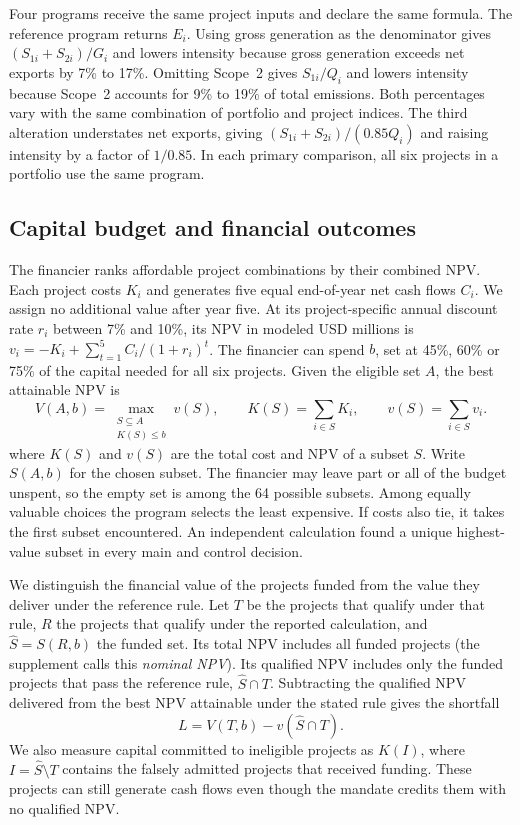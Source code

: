\documentclass[ijfs,article,submit,oneauthor]{Definitions/mdpi}
\begin{document}
Four programs receive the same project inputs and declare the same formula. The reference program returns $E_i$. Using gross generation as the denominator gives $(S_{1i}+S_{2i})/G_i$ and lowers intensity because gross generation exceeds net exports by 7\% to 17\%. Omitting Scope~2 gives $S_{1i}/Q_i$ and lowers intensity because Scope~2 accounts for 9\% to 19\% of total emissions. Both percentages vary with the same combination of portfolio and project indices. The third alteration understates net exports, giving $(S_{1i}+S_{2i})/(0.85 Q_i)$ and raising intensity by a factor of $1/0.85$. In each primary comparison, all six projects in a portfolio use the same program.

\subsection{Capital budget and financial outcomes}
The financier ranks affordable project combinations by their combined NPV. Each project costs $K_i$ and generates five equal end-of-year net cash flows $C_i$. We assign no additional value after year five. At its project-specific annual discount rate $r_i$ between 7\% and 10\%, its NPV in modeled USD millions is $v_i=-K_i+\sum_{t=1}^{5} C_i/(1+r_i)^t$. The financier can spend $b$, set at 45\%, 60\% or 75\% of the capital needed for all six projects. Given the eligible set $A$, the best attainable NPV is
\begin{equation}
 V(A,b)=\max_{\substack{S\subseteq A\\ K(S)\le b}}v(S),\qquad
 K(S)=\sum_{i\in S}K_i,\qquad v(S)=\sum_{i\in S}v_i . \label{eq:opt}
\end{equation}
where $K(S)$ and $v(S)$ are the total cost and NPV of a subset $S$. Write $S(A,b)$ for the chosen subset. The financier may leave part or all of the budget unspent, so the empty set is among the 64 possible subsets. Among equally valuable choices the program selects the least expensive. If costs also tie, it takes the first subset encountered. An independent calculation found a unique highest-value subset in every main and control decision.

We distinguish the financial value of the projects funded from the value they deliver under the reference rule. Let $T$ be the projects that qualify under that rule, $R$ the projects that qualify under the reported calculation, and $\widehat S=S(R,b)$ the funded set. Its total NPV includes all funded projects (the supplement calls this \emph{nominal NPV}). Its qualified NPV includes only the funded projects that pass the reference rule, $\widehat S\cap T$. Subtracting the qualified NPV delivered from the best NPV attainable under the stated rule gives the shortfall
\begin{equation}
 L=V(T,b)-v(\widehat S\cap T). \label{eq:loss}
\end{equation}
We also measure capital committed to ineligible projects as $K(I)$, where $I=\widehat S\setminus T$ contains the falsely admitted projects that received funding. These projects can still generate cash flows even though the mandate credits them with no qualified NPV.
\end{document}
